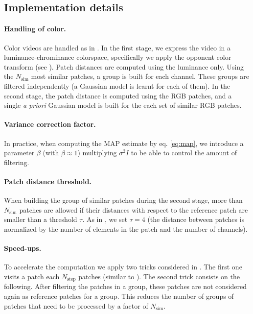 \documentclass{llncs}
\begin{document}
\subsection{Implementation details}

\paragraph{Handling of color.} Color videos are handled as in \cite{Lebrun2013a}.
%
In the first stage, we express the video in a luminance-chrominance colorspace,
specifically we apply the opponent color transform (see \cite{Dabov2007tip,Lebrun2013a}).
Patch distances are computed using the luminance only. Using the 
$N_{\text{sim}}$ most similar patches, a group is built for each channel. These
groups are filtered independently (a Gaussian model is learnt for each of them).
%
In the second stage, the patch distance is computed using the RGB patches, and
a single \textit{a priori} Gaussian model is built for the each set
of similar RGB patches. 

\paragraph{Variance correction factor.} In practice, when computing the MAP
estimate by eq. \eqref{eq:map}, we introduce a parameter $\beta$ (with $\beta \approx 1$) multiplying
$\sigma^2I$ to be able to control the amount of filtering.

\paragraph{Patch distance threshold.} When building the group of similar
patches during the second stage, more than $N_{\text{sim}}$ patches are allowed
if their distances with respect to the reference patch are smaller than a
threshold $\tau$.  As in \cite{Lebrun2013ipol}, we set $\tau = 4$ (the distance between
patches is normalized by the number of elements in the patch and the number of
channels).

\paragraph{Speed-ups.} To accelerate the computation we apply two tricks
considered in \cite{Lebrun2013ipol}. The first one visits a patch each $N_{\text{step}}$
patches (similar to \cite{Dabov2007tip}). The second trick consists on the following.
After filtering the patches in a group, these patches are not considered again
as reference patches for a group. This reduces the number of groups of patches
that need to be processed by a factor of $N_{\text{sim}}$.
\end{document}
